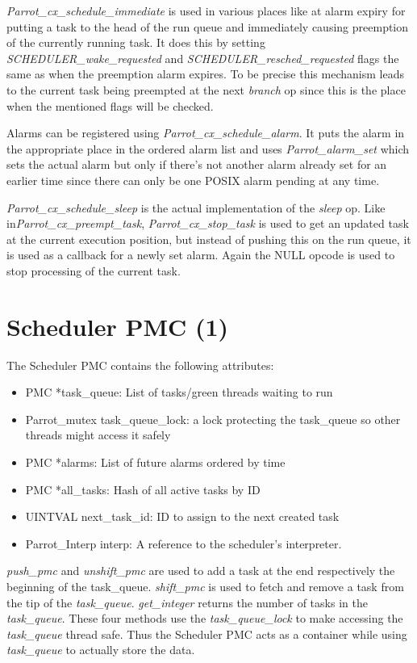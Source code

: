 \documentclass[bachelor,english]{hgbthesis}
\begin{document}
\textit{Parrot\_cx\_schedule\_immediate} is used in various places like at alarm expiry for putting a task to the head of the run queue and immediately causing preemption of the currently running task. It does this by setting \textit{SCHEDULER\_wake\_requested} and \textit{SCHEDULER\_resched\_requested} flags the same as when the preemption alarm expires. To be precise this mechanism leads to the current task being preempted at the next \textit{branch} op since this is the place when the mentioned flags will be checked.

Alarms can be registered using \textit{Parrot\_cx\_schedule\_alarm}. It puts the alarm in the appropriate place in the ordered alarm list and uses \textit{Parrot\_alarm\_set} which sets the actual alarm but only if there's not another alarm already set for an earlier time since there can only be one POSIX alarm pending at any time.

\textit{Parrot\_cx\_schedule\_sleep} is the actual implementation of the \textit{sleep} op. Like in\textit{Parrot\_cx\_preempt\_task}, \textit{Parrot\_cx\_stop\_task} is used to get an updated task at the current execution position, but instead of pushing this on the run queue, it is used as a callback for a newly set alarm. Again the NULL opcode is used to stop processing of the current task.

\section{Scheduler PMC (1)}

The Scheduler PMC contains the following attributes:
%
\begin{itemize}
\item PMC *task\_queue: List of tasks/green threads waiting to run
\item Parrot\_mutex task\_queue\_lock: a lock protecting the task\_queue so other threads might access it safely
\item PMC *alarms: List of future alarms ordered by time
\item PMC *all\_tasks: Hash of all active tasks by ID
\item UINTVAL next\_task\_id: ID to assign to the next created task
\item Parrot\_Interp interp: A reference to the scheduler's interpreter.
\end{itemize}

\textit{push\_pmc} and \textit{unshift\_pmc} are used to add a task at the end respectively the beginning of the task\_queue. \textit{shift\_pmc} is used to fetch and remove a task from the tip of the \textit{task\_queue}. \textit{get\_integer} returns the number of tasks in the \textit{task\_queue}. These four methods use the \textit{task\_queue\_lock} to make accessing the \textit{task\_queue} thread safe. Thus the Scheduler PMC acts as a container while using \textit{task\_queue} to actually store the data.
\end{document}
